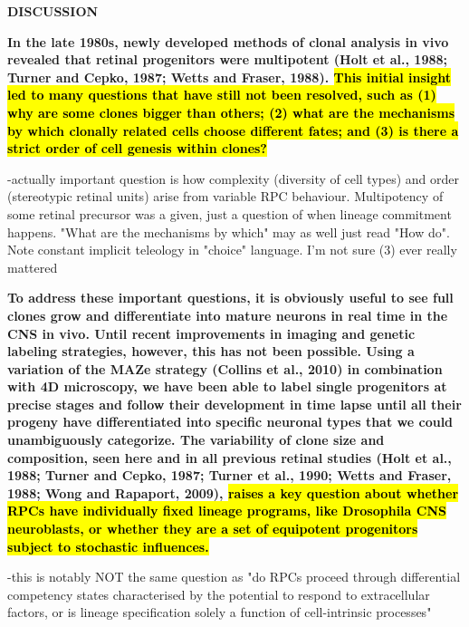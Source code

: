 \documentclass{ut-thesis}
\begin{document}
\bigskip

\textbf{DISCUSSION}

\bigskip

\textbf{
In the late 1980s, newly developed methods of clonal analysis
in vivo revealed that retinal progenitors were multipotent (Holt
et al., 1988; Turner and Cepko, 1987; Wetts and Fraser, 1988).
\hl{This initial insight led to many questions that have still not been
resolved, such as (1) why are some clones bigger than others;
(2) what are the mechanisms by which clonally related cells
choose different fates; and (3) is there a strict order of cell
genesis within clones?}
}

\bigskip

-actually important question is how complexity (diversity of cell types) and order (stereotypic retinal units) arise from variable RPC behaviour. Multipotency of some retinal precursor was a given, just a question of when lineage commitment happens. "What are the mechanisms by which" may as well just read "How do". Note constant implicit teleology in "choice" language. I'm not sure (3) ever really mattered

\bigskip

\textbf{
To address these important questions,
it is obviously useful to see full clones grow and differentiate
into mature neurons in real time in the CNS in vivo. Until recent
improvements in imaging and genetic labeling strategies,
however, this has not been possible. Using a variation of the
MAZe strategy (Collins et al., 2010) in combination with 4D
microscopy, we have been able to label single progenitors at
precise stages and follow their development in time lapse until
all their progeny have differentiated into specific neuronal types
that we could unambiguously categorize.
The variability of clone size and composition, seen here and in
all previous retinal studies (Holt et al., 1988; Turner and Cepko,
1987; Turner et al., 1990; Wetts and Fraser, 1988; Wong and
Rapaport, 2009), \hl{raises a key question about whether RPCs
have individually fixed lineage programs, like Drosophila CNS
neuroblasts, or whether they are a set of equipotent progenitors
subject to stochastic influences.} }

\bigskip

-this is notably NOT the same question as "do RPCs proceed through differential competency states characterised by the potential to respond to extracellular factors, or is lineage specification solely a function of cell-intrinsic processes"
\end{document}
